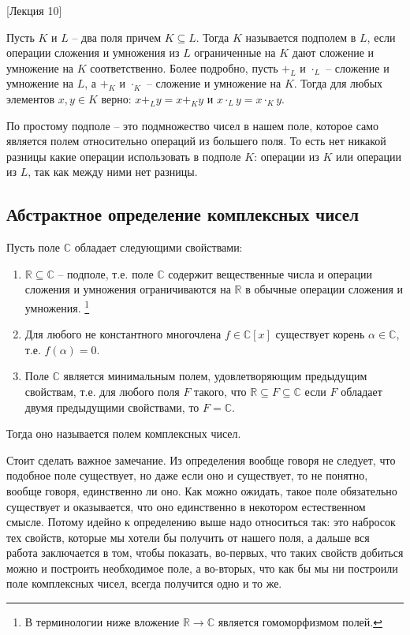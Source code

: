 [Лекция 10]


\begin{definition}
[Подполе]
Пусть $K$ и $L$ -- два поля причем $K \subseteq L$.
Тогда $K$ называется подполем в $L$, если операции сложения и умножения из $L$ ограниченные на $K$ дают сложение и умножение на $K$ соответственно.
Более подробно, пусть $+_L$ и $\cdot_L$ -- сложение и умножение на $L$, а $+_K$ и $\cdot_K$ -- сложение и умножение на $K$.
Тогда для любых элементов $x,y\in K$ верно: $x +_L y = x+_K y$ и $x\cdot_L y = x \cdot_K y$.
\end{definition}

По простому подполе -- это подмножество чисел в нашем поле, которое само является полем относительно операций из большего поля.
То есть нет никакой разницы какие операции использовать в подполе $K$: операции из $K$ или операции из $L$, так как между ними нет разницы.

\subsection{Абстрактное определение комплексных чисел}

\begin{definition}
Пусть поле $\mathbb C$ обладает следующими свойствами:
\begin{enumerate}
\item $\mathbb R\subseteq\mathbb C$ -- подполе, т.е. поле $\mathbb C$ содержит вещественные числа и операции сложения и умножения ограничиваются на $\mathbb R$ в обычные операции сложения и умножения.%
\footnote{В терминологии ниже вложение $\mathbb R\to \mathbb C$ является гомоморфизмом полей.}

\item Для любого не константного многочлена $f\in\mathbb C[x]$ существует корень $\alpha\in \mathbb C$, т.е. $f(\alpha) = 0$.

\item Поле $\mathbb C$ является минимальным полем, удовлетворяющим предыдущим свойствам, т.е. для любого поля $F$ такого, что $\mathbb R\subseteq F\subseteq \mathbb C$ если $F$ обладает двумя предыдущими свойствами, то $F = \mathbb C$.
\end{enumerate}
Тогда оно называется полем комплексных чисел.
\end{definition}

Стоит сделать важное замечание.
Из определения вообще говоря не следует, что подобное поле существует, но даже если оно и существует, то не понятно, вообще говоря, единственно ли оно.
Как можно ожидать, такое поле обязательно существует и оказывается, что оно единственно в некотором естественном смысле.
Потому идейно к определению выше надо относиться так: это набросок тех свойств, которые мы хотели бы получить от нашего поля, а дальше вся работа заключается в том, чтобы показать, во-первых, что таких свойств добиться можно и построить необходимое поле, а во-вторых, что как бы мы ни построили поле комплексных чисел, всегда получится одно и то же.

